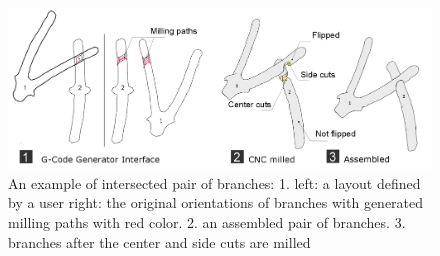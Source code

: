 \begin{figure}[H]
  \begin{center}
    \includegraphics[width = 0.4\paperwidth]{images/system/joint_milling_diagram_4.png}
    \caption{An example of intersected pair of branches: 1. left: a layout defined by a user right: the original orientations of branches with generated milling paths with red color. 2. an assembled pair of branches. 3. branches after the center and side cuts are milled   }
    \label{fig:joint_geometry}
  \end{center}
\end{figure}
